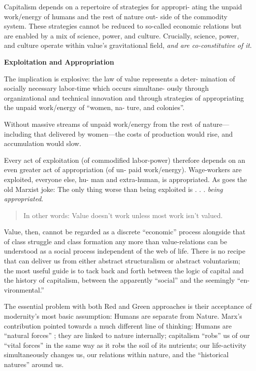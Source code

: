 \documentclass[
]{book}
\begin{document}
Capitalism depends on a repertoire of strategies for appropri-
ating the unpaid work/energy of humans and the rest of nature out-
side of the commodity system. These strategies cannot be reduced to
so-called economic relations but are enabled by a mix of science,
power, and culture. Crucially, science, power, and culture operate
within value's gravitational field, \emph{and are co-constitutive of it}.

\textbf{Exploitation and Appropriation}

The implication is explosive: the law of value represents a deter-
mination of socially necessary labor-time which occurs simultane-
ously through organizational and technical innovation and through
strategies of appropriating the unpaid work/energy of ``women, na-
ture, and colonies''.

Without massive streams of unpaid work/energy from the rest of
nature---including that delivered by women---the costs of production would rise,
and accumulation would slow.

Every act of exploitation (of commodified labor-power)
therefore depends on an even greater act of appropriation (of un-
paid work/energy). Wage-workers are exploited, everyone else, hu-
man and extra-human, is appropriated. As goes the old Marxist joke:
The only thing worse than being exploited is . . . \emph{being appropriated}.

\begin{quote}
In other words: Value doesn't work unless most work isn't valued.
\end{quote}

Value, then, cannot be regarded as a discrete ``economic'' process
alongside that of class struggle and class formation any more than
value-relations can be understood as a social process independent of
the web of life. There is no recipe that can deliver us from either
abstract structuralism or abstract voluntarism; the most useful guide
is to tack back and forth between the logic of capital and the history
of capitalism, between the apparently ``social'' and the seemingly ``en-
vironmental.''

The essential problem with both Red
and Green approaches is their acceptance of modernity's most basic
assumption: Humans are separate from Nature.
Marx's contribution pointed towards a much different line of thinking:
Humans are ``natural forces'' ; they are linked to nature
internally; capitalism ``robs'' us of our ``vital forces'' in the same
way as it robs the soil of its nutrients; our life-activity
simultaneously changes us, our relations within nature, and the ``historical
natures'' around us.
\end{document}
